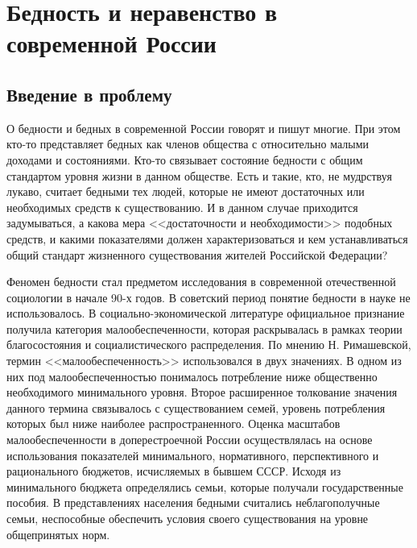 \section{Бедность и неравенство в современной России}

\subsection{Введение в проблему}
О бедности и бедных в современной России говорят и пишут многие. При этом 
кто-то представляет бедных как членов общества с относительно малыми доходами 
и состояниями. Кто-то связывает состояние бедности с общим стандартом уровня 
жизни в данном обществе. Есть и такие, кто, не мудрствуя лукаво, считает 
бедными тех людей, которые не имеют достаточных или необходимых средств к 
существованию. И в данном случае приходится задумываться, а какова мера 
<<достаточности и необходимости>> подобных средств, и какими показателями 
должен характеризоваться и кем устанавливаться общий стандарт жизненного 
существования жителей Российской Федерации? 

Феномен бедности стал предметом исследования в современной отечественной 
социологии в начале 90-х годов. В советский период понятие бедности в науке 
не использовалось. В социально-экономической литературе официальное признание 
получила категория малообеспеченности, которая раскрывалась в рамках теории 
благосостояния и социалистического распределения. По мнению Н. Римашевской, 
термин <<малообеспеченность>> использовался в двух значениях. В одном из них 
под малообеспеченностью понималось потребление ниже общественно необходимого 
минимального уровня. Второе расширенное толкование значения данного термина 
связывалось с существованием семей, уровень потребления которых был ниже 
наиболее распространенного. Оценка масштабов малообеспеченности в 
доперестроечной России осуществлялась на основе использования показателей 
минимального, нормативного, перспективного и рационального бюджетов, 
исчисляемых в бывшем СССР. Исходя из минимального бюджета определялись 
семьи, которые получали государственные пособия. В представлениях населения 
бедными считались неблагополучные семьи, неспособные обеспечить условия 
своего существования на уровне общепринятых норм.

